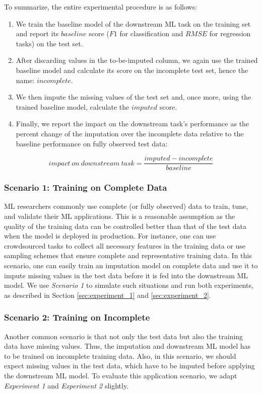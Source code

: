\documentclass[utf8]{frontiersSCNS} %
\begin{document}
To summarize, the entire experimental procedure is as follows:
%
\begin{enumerate}
	\item We train the baseline model of the downstream ML task on the training set and report its $baseline$ score ($F1$ for classification and $RMSE$ for regression tasks) on the test set.
	\item After discarding values in the to-be-imputed column, we again use the trained baseline model and calculate its score on the incomplete test set, hence the name: $incomplete$.
	\item We then impute the missing values of the test set and, once more, using the trained baseline model, calculate the $imputed$ score.
	\item Finally, we report the impact on the downstream task's performance as the percent change of the imputation over the incomplete data relative to the baseline performance on fully observed test data:
\end{enumerate}
%
\begin{equation}
	impact\ on \ downstream\ task = \frac{imputed - incomplete}{baseline}
	\label{eq:impact}
\end{equation}
%



\subsubsection{Scenario 1: Training on Complete Data}
\label{sec:scenario_1}
%
ML researchers commonly use complete (or fully observed) data to train, tune, and validate their ML applications. This is a reasonable assumption as the quality of the training data can be controlled better than that of the test data when the model is deployed in production. For instance, one can use crowdsourced tasks to collect all necessary features in the training data or use sampling schemes that ensure complete and representative training data. In this scenario, one can easily train an imputation model on complete data and use it to impute missing values in the test data before it is fed into the downstream ML model. We use \emph{Scenario 1} to simulate such situations and run both experiments, as described in Section \ref{sec:experiment_1} and \ref{sec:experiment_2}.

\subsubsection{Scenario 2: Training on Incomplete}
\label{sec:scenario_2}
%
Another common scenario is that not only the test data but also the training data have missing values. Thus, the imputation and downstream ML model has to be trained on incomplete training data. Also, in this scenario, we should expect missing values in the test data, which have to be imputed before applying the downstream ML model. To evaluate this application scenario, we adapt \emph{Experiment 1} and \emph{Experiment 2} slightly.
\end{document}

